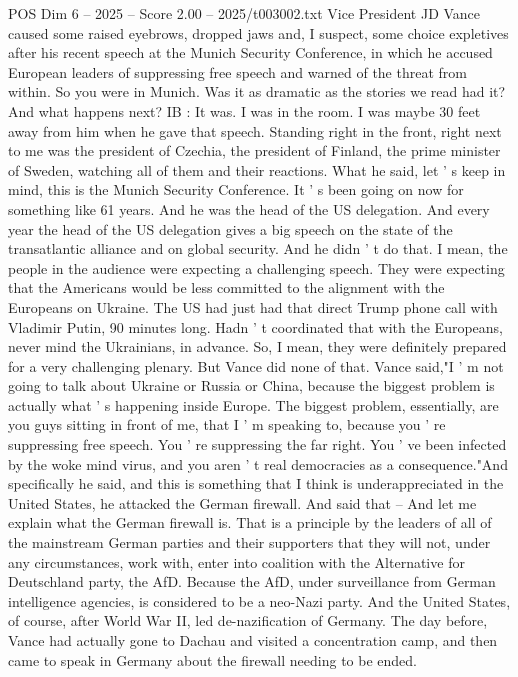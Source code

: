 \begin{textsample}{POS Dim 6 – 2025 – Score 2.00 – 2025/t003002.txt}
Vice President JD Vance caused some raised eyebrows, dropped jaws and, I suspect, some choice expletives after his recent speech at the Munich Security Conference, in which he accused European leaders of suppressing free speech and warned of the threat from within.
So you were in Munich.
Was it as dramatic as the stories we read had it?
And what happens next?
IB : It was.
I was in the room.
I was maybe 30 feet away from him when he gave that speech.
Standing right in the front, right next to me was the president of Czechia, the president of Finland, the prime minister of Sweden, watching all of them and their reactions.
What he said, let ' s keep in mind, this is the Munich Security Conference.
It ' s been going on now for something like 61 years.
And he was the head of the US delegation.
And every year the head of the US delegation gives a big speech on the state of the transatlantic alliance and on global security.
And he didn ' t do that.
I mean, the people in the audience were expecting a challenging speech.
They were expecting that the Americans would be less committed to the alignment with the Europeans on Ukraine.
The US had just had that direct Trump phone call with Vladimir Putin, 90 minutes long.
Hadn ' t coordinated that with the Europeans, never mind the Ukrainians, in advance.
So, I mean, they were definitely prepared for a very challenging plenary.
But Vance did none of that.
Vance said,"I ' m not going to talk about Ukraine or Russia or China, because the biggest problem is actually what ' s happening inside Europe.
The biggest problem, essentially, are you guys sitting in front of me, that I ' m speaking to, because you ' re suppressing free speech.
You ' re suppressing the far right.
You ' ve been infected by the woke mind virus, and you aren ' t real democracies as a consequence."And specifically he said, and this is something that I think is underappreciated in the United States, he attacked the German firewall.
And said that -- And let me explain what the German firewall is.
That is a principle by the leaders of all of the mainstream German parties and their supporters that they will not, under any circumstances, work with, enter into coalition with the Alternative for Deutschland party, the AfD.
Because the AfD, under surveillance from German intelligence agencies, is considered to be a neo-Nazi party.
And the United States, of course, after World War II, led de-nazification of Germany.
The day before, Vance had actually gone to Dachau and visited a concentration camp, and then came to speak in Germany about the firewall needing to be ended.

\end{textsample}
